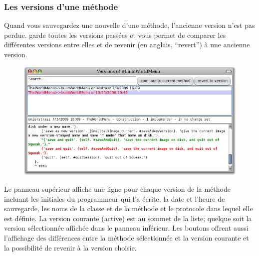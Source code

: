 \documentclass[a4paper,10pt,twoside]{book}
\begin{document}
\subsubsection{Les versions d'une m\'ethode}

Quand vous sauvegardez une nouvelle  d'une m\'ethode,
l'ancienne version n'est pas perdue. \pharo garde toutes les versions pass\'ees et vous permet de comparer les diff\'erentes versions entre elles et de revenir (en anglais, ``revert'') \`a une ancienne version.
\begin{figure}[btp]
   \centering
	   {\includegraphics[width=\textwidth]{Versions} }
   \caption{}
\end{figure} %



Le panneau sup\'erieur affiche une ligne pour chaque version de la m\'ethode
incluant les initiales du programmeur qui l'a \'ecrite, la date et l'heure de
sauvegarde, les noms de la classe et de la m\'ethode et le protocole dans 
lequel elle est d\'efinie.
La version courante (active) est au sommet de la liste; quelque soit la version
s\'electionn\'ee affich\'ee dans le panneau inf\'erieur.
Les boutons offrent aussi l'affichage des diff\'erences entre la m\'ethode s\'electionn\'ee et la version courante et la possibilit\'e de revenir \`a la version choisie.  
\end{document}
